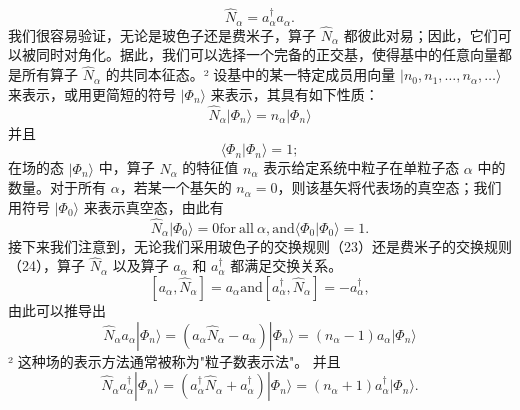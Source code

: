 \begin{equation}\tag{11.1.36}\label{eq:11.1.36}
\hat { N } _ { \alpha } = a _ { \alpha } ^{\dagger} a _ { \alpha } .
\end{equation}
我们很容易验证，无论是玻色子还是费米子，算子 \(\hat{N}_{\alpha}\) 都彼此对易；因此，它们可以被同时对角化。据此，我们可以选择一个完备的正交基，使得基中的任意向量都是所有算子 \(\hat{N}_{\alpha}\) 的共同本征态。² 设基中的某一特定成员用向量 \(|n_{0},n_{1},\ldots,n_{\alpha},\ldots\rangle\) 来表示，或用更简短的符号 \(|\Phi_{n}\rangle\) 来表示，其具有如下性质：
\begin{equation}\tag{11.1.37}\label{eq:11.1.37}
\hat { N } _ { \alpha } | \Phi _ { n } \rangle = n _ { \alpha } | \Phi _ { n } \rangle
\end{equation}
并且
\begin{equation}\tag{11.1.38}\label{eq:11.1.38}
\langle \Phi _ { n } | \Phi _ { n } \rangle = 1 ;
\end{equation}
在场的态 \(|\Phi_{n}\rangle\) 中，算子 \(\hat{N}_{\alpha}\) 的特征值 \(n_{\alpha}\) 表示给定系统中粒子在单粒子态 \(\alpha\) 中的数量。对于所有 \(\alpha\)，若某一个基矢的 \(n_{\alpha}=0\)，则该基矢将代表场的真空态；我们用符号 \(|\Phi_{0}\rangle\) 来表示真空态，由此有
\begin{equation}\tag{11.1.39}\label{eq:11.1.39}
\hat { N } _ { \alpha } | \Phi _ { 0 } \rangle = 0  \mathrm { f o r ~ a l l ~ } \alpha ,  \mathrm { a n d }  \langle \Phi _ { 0 } | \Phi _ { 0 } \rangle = 1 .
\end{equation}
接下来我们注意到，无论我们采用玻色子的交换规则（23）还是费米子的交换规则（24），算子 \(\hat{N}_{\alpha}\) 以及算子 \(a_{\alpha}\) 和 \(a_{\alpha}^{\dagger}\) 都满足交换关系。
\begin{equation}\tag{11.1.40}\label{eq:11.1.40}
[ a _ { \alpha } , \hat { N } _ { \alpha } ] = a _ { \alpha }  \mathrm { a n d }  [ a _ { \alpha } ^{\dagger} , \hat { N } _ { \alpha } ] = - a _ { \alpha } ^{\dagger} ,
\end{equation}
由此可以推导出
\begin{equation}\tag{11.1.41}\label{eq:11.1.41}
\hat { N } _ { \alpha } a _ { \alpha } | \Phi _ { n } \rangle = ( a _ { \alpha } \hat { N } _ { \alpha } - a _ { \alpha } ) | \Phi _ { n } \rangle = ( n _ { \alpha } - 1 ) a _ { \alpha } | \Phi _ { n } \rangle
\end{equation}
² 这种场的表示方法通常被称为"粒子数表示法"。
并且
\begin{equation}\tag{11.1.42}\label{eq:11.1.42}
\hat { N } _ { \alpha } a _ { \alpha } ^{\dagger} | \Phi _ { n } \rangle = ( a _ { \alpha } ^{\dagger} \hat { N } _ { \alpha } + a _ { \alpha } ^{\dagger} ) | \Phi _ { n } \rangle = ( n _ { \alpha } + 1 ) a _ { \alpha } ^{\dagger} | \Phi _ { n } \rangle .
\end{equation}
